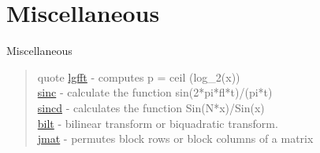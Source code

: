 \section*{Miscellaneous}{Miscellaneous}
\begin{quote}{quote}
\noindent
\hyperlink{lgfft}{lgfft} - computes p = ceil (log\_2(x)) \\
\hyperlink{sinc}{sinc} - calculate the function sin(2*pi*fl*t)/(pi*t) \\
\hyperlink{sincd}{sincd} - calculates the function Sin(N*x)/Sin(x) \\
\hyperlink{bilt}{bilt} - bilinear transform or biquadratic transform. \\
\hyperlink{jmat}{jmat} - permutes block rows or block columns of a matrix  
\end{quote}











































